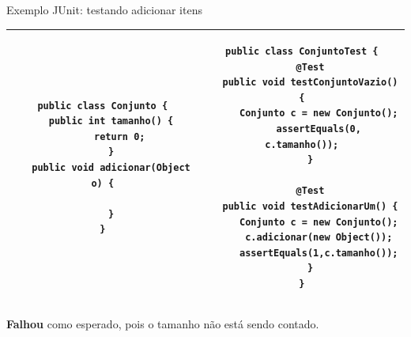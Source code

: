 \documentclass[handout]{beamer}
\begin{document}
\begin{frame}[fragile]{Exemplo JUnit: testando adicionar itens}

\begin{tabular}{|c|c|}
\hline
\begin{minipage}{.45\textwidth}
\begin{lstlisting}[basicstyle=\tiny]
public class Conjunto {
   public int tamanho() {
      return 0;
   }
   public void adicionar(Object o) {
      
   }
}
\end{lstlisting}
\end{minipage} &
\begin{minipage}{.5\textwidth}
\begin{lstlisting}[basicstyle=\tiny]
public class ConjuntoTest {
   @Test
   public void testConjuntoVazio() {
      Conjunto c = new Conjunto();
      assertEquals(0, c.tamanho());
   }

   @Test
   public void testAdicionarUm() {
      Conjunto c = new Conjunto();
      c.adicionar(new Object());
      assertEquals(1,c.tamanho());
   }
}
\end{lstlisting}
\end{minipage} \\ \hline
\end{tabular}

\vspace{2mm}

\textcolor[rgb]{.5,0,0}{\bf Falhou} como esperado, pois o tamanho não está sendo contado.

\end{frame}
\end{document}
